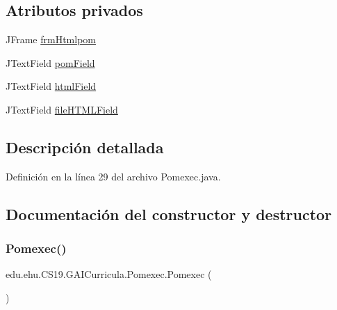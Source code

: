 \subsection*{Atributos privados}
\begin{DoxyCompactItemize}
\item 
J\+Frame \mbox{\hyperlink{classedu_1_1ehu_1_1_c_s19_1_1_g_a_i_curricula_1_1_pomexec_a1927e599316cd24b73c1148e28cb0532}{frm\+Htmlpom}}
\item 
J\+Text\+Field \mbox{\hyperlink{classedu_1_1ehu_1_1_c_s19_1_1_g_a_i_curricula_1_1_pomexec_a7ea71ef0b61fa8df0b1689d11ce167cf}{pom\+Field}}
\item 
J\+Text\+Field \mbox{\hyperlink{classedu_1_1ehu_1_1_c_s19_1_1_g_a_i_curricula_1_1_pomexec_a70bdb1d4b3b75dab759706ce0d85c9cf}{html\+Field}}
\item 
J\+Text\+Field \mbox{\hyperlink{classedu_1_1ehu_1_1_c_s19_1_1_g_a_i_curricula_1_1_pomexec_ac458a48643144b5728bb22fdace1dada}{file\+H\+T\+M\+L\+Field}}
\end{DoxyCompactItemize}


\subsection{Descripción detallada}


Definición en la línea 29 del archivo Pomexec.\+java.



\subsection{Documentación del constructor y destructor}
\mbox{\label{classedu_1_1ehu_1_1_c_s19_1_1_g_a_i_curricula_1_1_pomexec_a8de2bd06d0893d4f24ef2bd8216467cf}} 
\subsubsection{\texorpdfstring{Pomexec()}{Pomexec()}}
{\footnotesize\ttfamily edu.\+ehu.\+C\+S19.\+G\+A\+I\+Curricula.\+Pomexec.\+Pomexec (\begin{DoxyParamCaption}{ }\end{DoxyParamCaption})}



